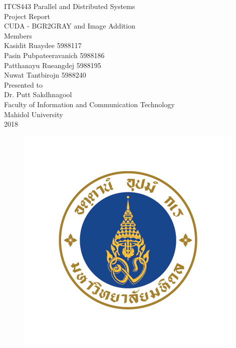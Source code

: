 \documentclass[11pt]{article}
\begin{document}
\begin{titlepage}

	\begin{center}
	
	\huge ITCS443 Parallel and Distributed Systems\\
	[0.8cm]
	\LARGE Project Report\\
	[0.3cm]
	\Large CUDA - BGR2GRAY and Image Addition\\
	[1.5cm]
	\LARGE Members\\
	[0.5cm]
	\Large Kasidit   	Ruaydee   		   5988117\\
	[0.2cm]
	\Large Pasin        Pubpateeravanich   5988186\\
	[0.2cm] 
	\Large Patthanayu   Rueangdej   	   5988195\\ 
	[0.2cm]
	\Large Nuwat   		Tantbirojn   	   5988240\\    
	[1.5cm]
	\LARGE Presented to\\
	[0.2cm]
	\Large Dr. Putt Sakdhnagool\\
	[1.5cm]
	\Large Faculty of Information and Communication Technology\\
	[0.2cm]
	\Large Mahidol University\\
	[0.2cm]
	\Large 2018
	\begin{figure}[h]
	\centering
	\includegraphics[scale=0.35]{mu}
	\end{figure}
	
	\end{center}
	
\end{titlepage}
\end{document}
